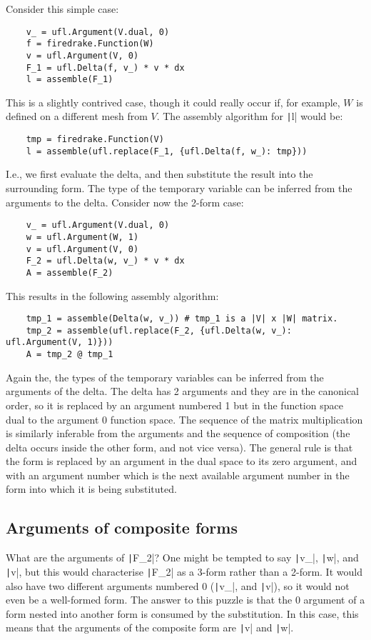 \documentclass[a4paper,11pt]{article}
\begin{document}
Consider this simple case:
\begin{verbatim}
    v_ = ufl.Argument(V.dual, 0)
    f = firedrake.Function(W)
    v = ufl.Argument(V, 0)
    F_1 = ufl.Delta(f, v_) * v * dx
    l = assemble(F_1)
\end{verbatim}
This is a slightly contrived case, though it could really occur if, for example, $W$ is defined on a different mesh from $V$. The assembly algorithm for \texttt|l| would be:
\begin{verbatim}
    tmp = firedrake.Function(V)
    l = assemble(ufl.replace(F_1, {ufl.Delta(f, w_): tmp}))
\end{verbatim}
I.e., we first evaluate the delta, and then substitute the result into the surrounding form. The type of the temporary variable can be inferred from the arguments to the delta. Consider now the 2-form case:
\begin{verbatim}
    v_ = ufl.Argument(V.dual, 0)
    w = ufl.Argument(W, 1)
    v = ufl.Argument(V, 0)
    F_2 = ufl.Delta(w, v_) * v * dx
    A = assemble(F_2)
\end{verbatim}
This results in the following assembly algorithm:
\begin{verbatim}
    tmp_1 = assemble(Delta(w, v_)) # tmp_1 is a |V| x |W| matrix.
    tmp_2 = assemble(ufl.replace(F_2, {ufl.Delta(w, v_): ufl.Argument(V, 1)}))
    A = tmp_2 @ tmp_1
\end{verbatim}
Again the, the types of the temporary variables can be inferred from the arguments of the delta. The delta has 2 arguments and they are in the canonical order, so it is replaced by an argument numbered 1 but in the function space dual to the argument 0 function space. The sequence of the matrix multiplication is similarly inferable from the arguments and the sequence of composition (the delta occurs inside the other form, and not vice versa). The general rule is that the form is replaced by an argument in the dual space to its zero argument, and with an argument number which is the next available argument number in the form into which it is being substituted.

\subsection{Arguments of composite forms}

What are the arguments of \texttt|F_2|? One might be tempted to say \texttt|v_|, \texttt|w|, and \texttt|v|, but this would characterise \texttt|F_2| as a 3-form rather than a 2-form. It would also have two different arguments numbered 0 (\texttt|v_|, and \texttt|v|), so it would not even be a well-formed form. The answer to this puzzle is that the 0 argument of a form nested into another form is consumed by the substitution. In this case, this means that the arguments of the composite form are \texttt|v| and \texttt|w|.
\end{document}
